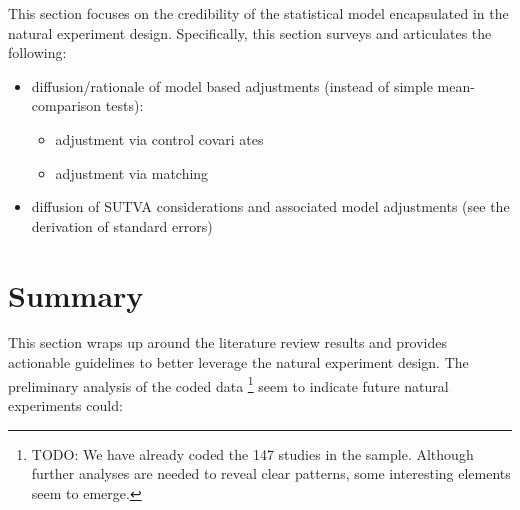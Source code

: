 \documentclass[nobib]{tufte-handout}
\newcommand{\todo}[1]{}
\renewcommand{\todo}[1]{{\color{red} TODO: {#1}}}
\begin{document}
\begin{refsection}
\noindent This section focuses on the credibility of the statistical model
encapsulated in the natural experiment design. Specifically, this section surveys and articulates the following:

\begin{itemize}
    \item diffusion/rationale of model based adjustments (instead of simple
        mean-comparison tests):
        \begin{itemize}
            \item adjustment via control covari ates
            \item adjustment via matching
        \end{itemize}
    \item diffusion of SUTVA considerations and associated model adjustments
        (see the derivation of standard errors)
\end{itemize}


%
%
%
%
%
%
%
%
%
%
%
%

\section{Summary}

This section wraps up around the literature review results and provides
actionable guidelines to better leverage the natural experiment design. The
preliminary analysis of the coded data \footnote{\todo{We have already coded the
147 studies in the sample. Although further analyses are needed to reveal clear
patterns, some interesting elements seem to emerge.}} seem to indicate future
natural experiments could:


\end{refsection}
\end{document}
